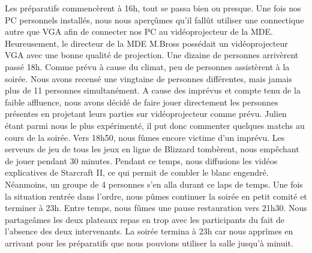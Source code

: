 Les préparatifs commencèrent à 16h, tout se passa bien ou presque. Une fois nos PC personnels
installés, nous nous aperçûmes qu’il fallût utiliser une connectique autre que VGA afin de
connecter nos PC au vidéoprojecteur de la MDE. Heureusement, le directeur de la MDE M.Bross
possédait un vidéoprojecteur VGA avec une bonne qualité de projection.
Une dizaine de personnes arrivèrent passé 18h. Comme prévu à cause du climat, peu de
personnes assistèrent à la soirée. Nous avons recensé une vingtaine de personnes
différentes, mais jamais plus de 11 personnes simultanément.
A cause des imprévus et compte tenu de la faible affluence, nous avons décidé de faire jouer
directement les personnes présentes en projetant leurs parties sur vidéoprojecteur comme
prévu. Julien étant parmi nous le plus expérimenté, il put donc commenter quelques matchs
au cours de la soirée.
Vers 18h50, nous fûmes encore victime d’un imprévu. Les serveurs de jeu de tous les jeux en
ligne de Blizzard tombèrent, nous empêchant de jouer pendant 30 minutes. Pendant ce
temps, nous diffusions les vidéos explicatives de Starcraft II, ce qui permit de combler le
blanc engendré. Néanmoins, un groupe de 4 personnes s’en alla durant ce laps de temps.
Une fois la situation rentrée dans l’ordre, nous pûmes continuer la soirée en petit comité et
terminer à 23h. Entre temps, nous fûmes une pause restauration vers 21h30. Nous
partageâmes les deux plateaux repas en trop avec les participants du fait de l’absence des
deux intervenants. La soirée termina à 23h car nous apprîmes en arrivant pour les préparatifs
que nous pouvions utiliser la salle jusqu’à minuit.

